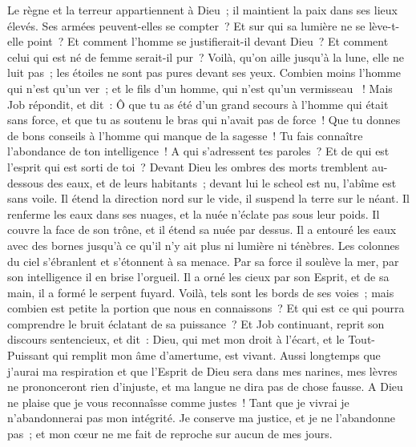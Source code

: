 \begin{multicols}{2}
Le règne et la terreur appartiennent à Dieu~; il maintient la paix dans ses lieux élevés.
 Ses armées peuvent-elles se compter~? Et sur qui sa lumière ne se lève-t-elle point~?
Et comment l'homme se justifierait-il devant Dieu~? Et comment celui qui est né de femme serait-il pur~?
Voilà, qu'on aille jusqu'à la lune, elle ne luit pas~; les étoiles ne sont pas pures devant ses yeux.
Combien moins l'homme qui n'est qu'un ver~; et le fils d'un homme, qui n'est qu'un vermisseau ~!
\VerseOne{}Mais Job répondit, et dit~:
Ô que tu as été d'un grand secours à l'homme qui était sans force, et que tu as soutenu le bras qui n'avait pas de force~!
Que tu donnes de bons conseils à l'homme qui manque de la sagesse~! Tu fais connaître l'abondance de ton intelligence~!
A qui s'adressent tes paroles~? Et de qui est l'esprit qui est sorti de toi~?
Devant Dieu les ombres des morts tremblent au-dessous des eaux, et de leurs habitants~;
devant lui le scheol est nu, l'abîme est sans voile.
Il étend la direction nord sur le vide, il suspend la terre sur le néant.
Il renferme les eaux dans ses nuages, et la nuée n'éclate pas sous leur poids.
Il couvre la face de son trône, et il étend sa nuée par dessus.
Il a entouré les eaux avec des bornes jusqu'à ce qu'il n'y ait plus ni lumière ni ténèbres.
Les colonnes du ciel s'ébranlent et s'étonnent à sa menace.
Par sa force il soulève la mer, par son intelligence il en brise l'orgueil.
Il a orné les cieux par son Esprit, et de sa main, il a formé le serpent fuyard.
Voilà, tels sont les bords de ses voies~; mais combien est petite la portion que nous en connaissons~? Et qui est ce qui pourra comprendre le bruit éclatant de sa puissance~?
\VerseOne{}Et Job continuant, reprit son discours sentencieux, et dit~:
Dieu, qui met mon droit à l'écart, et le Tout-Puissant qui remplit mon âme d'amertume, est vivant.
Aussi longtemps que j'aurai ma respiration et que l'Esprit de Dieu sera dans mes narines,
mes lèvres ne prononceront rien d'injuste, et ma langue ne dira pas de chose fausse.
A Dieu ne plaise que je vous reconnaîsse comme justes~! Tant que je vivrai je n'abandonnerai pas mon intégrité.
Je conserve ma justice, et je ne l'abandonne pas~; et mon cœur ne me fait de reproche sur aucun de mes jours.

\end{multicols}
